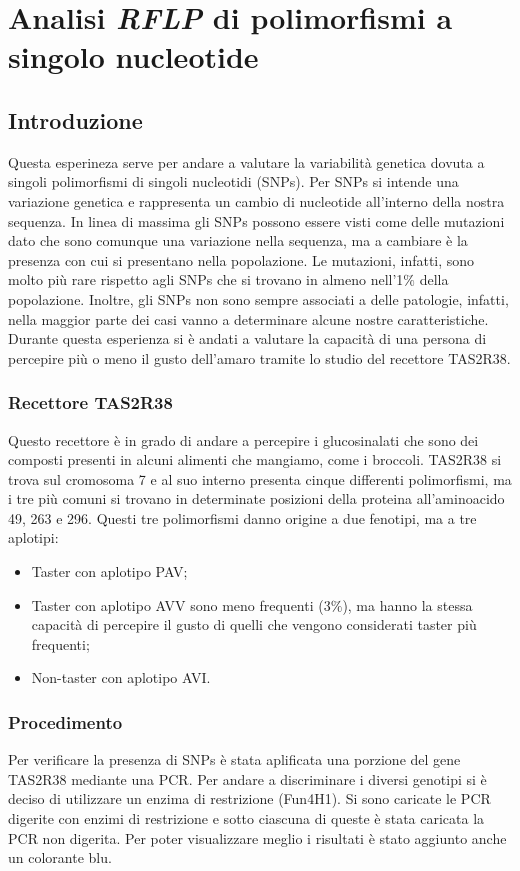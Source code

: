 \section*{Analisi \emph{RFLP} di polimorfismi a singolo nucleotide}

	\subsection*{Introduzione}
	Questa esperineza serve per andare a valutare la variabilità genetica dovuta a singoli polimorfismi di singoli nucleotidi (SNPs). Per SNPs si intende una variazione genetica e rappresenta un cambio di nucleotide all'interno della nostra sequenza. In linea di massima gli SNPs possono essere visti come delle mutazioni dato che sono comunque una variazione nella sequenza, ma a cambiare è la presenza con cui si presentano nella popolazione. Le mutazioni, infatti, sono molto più rare  rispetto agli SNPs che si trovano in almeno nell'1$\%$ della popolazione. Inoltre, gli SNPs non sono sempre associati a delle patologie, infatti, nella maggior parte dei casi vanno a determinare alcune nostre caratteristiche. 
	Durante questa esperienza si è andati a valutare la capacità di una persona di percepire più o meno il gusto dell'amaro tramite lo studio del recettore TAS2R38. 
	
	    \subsubsection*{Recettore TAS2R38}
	    Questo recettore è in grado di andare a percepire i glucosinalati che sono dei composti presenti in alcuni alimenti che mangiamo, come i broccoli. 
	    TAS2R38 si trova sul cromosoma 7 e al suo interno presenta cinque differenti polimorfismi, ma i tre più comuni si trovano in determinate posizioni della proteina all'aminoacido 49, 263 e 296. Questi tre polimorfismi danno origine a due fenotipi, ma a tre aplotipi: 
	    	\begin{itemize}
				\item Taster con aplotipo PAV;
				\item Taster con aplotipo AVV sono meno frequenti (3$\%$), ma hanno la stessa capacità di percepire il gusto di quelli che vengono considerati taster più frequenti;
				\item Non-taster con aplotipo AVI. 
		\end{itemize}
	
	    
	    \subsubsection*{Procedimento}
	    Per verificare la presenza di SNPs è stata aplificata una porzione del gene TAS2R38 mediante una PCR. Per andare a discriminare i diversi genotipi si è deciso di utilizzare un enzima di restrizione (Fun4H1). 
	    Si sono caricate le PCR digerite con enzimi di restrizione e sotto ciascuna di queste è stata caricata la PCR non digerita. Per poter visualizzare meglio i risultati è stato aggiunto anche un colorante blu. 
	   
